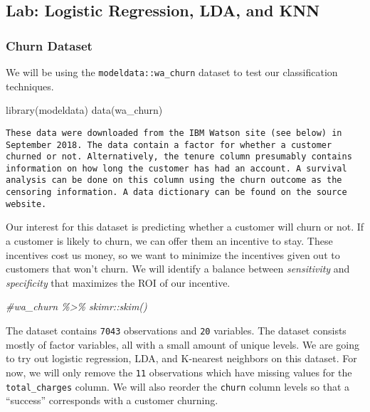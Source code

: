 \documentclass[
]{article}
\newenvironment{Shaded}{\begin{snugshade}}{\end{snugshade}}
\newcommand{\CommentTok}[1]{\textcolor[rgb]{0.56,0.35,0.01}{\textit{#1}}}
\newcommand{\FunctionTok}[1]{\textcolor[rgb]{0.00,0.00,0.00}{#1}}
\newcommand{\NormalTok}[1]{#1}
\begin{document}
\hypertarget{lab-logistic-regression-lda-and-knn}{%
\subsection{Lab: Logistic Regression, LDA, and
KNN}\label{lab-logistic-regression-lda-and-knn}}

\hypertarget{churn-dataset}{%
\subsubsection{Churn Dataset}\label{churn-dataset}}

We will be using the \texttt{modeldata::wa\_churn} dataset to test our
classification techniques.

\begin{Shaded}
\begin{Highlighting}[]
\FunctionTok{library}\NormalTok{(modeldata)}
\FunctionTok{data}\NormalTok{(wa\_churn)}
\end{Highlighting}
\end{Shaded}

\begin{verbatim}
These data were downloaded from the IBM Watson site (see below) in September 2018. The data contain a factor for whether a customer churned or not. Alternatively, the tenure column presumably contains information on how long the customer has had an account. A survival analysis can be done on this column using the churn outcome as the censoring information. A data dictionary can be found on the source website.
\end{verbatim}

Our interest for this dataset is predicting whether a customer will
churn or not. If a customer is likely to churn, we can offer them an
incentive to stay. These incentives cost us money, so we want to
minimize the incentives given out to customers that won't churn. We will
identify a balance between \emph{sensitivity} and \emph{specificity}
that maximizes the ROI of our incentive.

\begin{Shaded}
\begin{Highlighting}[]
\CommentTok{\#wa\_churn \%\textgreater{}\% skimr::skim()}
\end{Highlighting}
\end{Shaded}

The dataset contains \texttt{7043} observations and \texttt{20}
variables. The dataset consists mostly of factor variables, all with a
small amount of unique levels. We are going to try out logistic
regression, LDA, and K-nearest neighbors on this dataset. For now, we
will only remove the \texttt{11} observations which have missing values
for the \texttt{total\_charges} column. We will also reorder the
\texttt{churn} column levels so that a ``success'' corresponds with a
customer churning.
\end{document}

